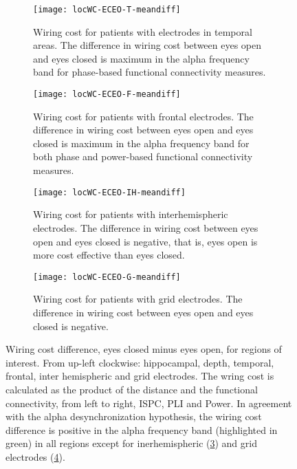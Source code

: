 \documentclass[11pt, onecolumn]{article}
\begin{document}
{\begin{figure}[p]
  
  \begin{subfigure}[t]{0.5\linewidth}
    \centering
    \texttt{[image: locWC-ECEO-T-meandiff]} 
    \caption{Wiring cost for patients with electrodes in temporal areas. The difference in wiring cost between eyes open and eyes closed is maximum in the alpha frequency band for phase-based functional connectivity measures.} 
    \label{figi-2:c} 
  \end{subfigure} 
  \hspace{1ex}
 \begin{subfigure}[t]{0.5\linewidth}
    \centering
    \texttt{[image: locWC-ECEO-F-meandiff]} 
    \caption{Wiring cost for patients with frontal electrodes. The difference in wiring cost between eyes open and eyes closed is maximum in the alpha frequency band for both phase and power-based functional connectivity measures.} 
    \label{figi-2:d} 
  \end{subfigure} 
    \begin{subfigure}[t]{ 0.5\linewidth}
    \centering
    \texttt{[image: locWC-ECEO-IH-meandiff]} 
    \caption{Wiring cost for patients with interhemispheric electrodes. The difference in wiring cost between eyes open and eyes closed is negative, that is, eyes open is more cost effective than eyes closed.} 
    \label{figi-2:e} 
  \end{subfigure}%
    \hspace{1ex}
   \begin{subfigure}[t]{0.5\linewidth}
    \centering
    \texttt{[image: locWC-ECEO-G-meandiff]} 
    \caption{Wiring cost for patients with grid electrodes. The difference in wiring cost between eyes open and eyes closed is negative.} 
    \label{figi-2:f} 
  \end{subfigure} \newpage
  \caption{Wiring cost difference, eyes closed minus eyes open, for regions of interest. From up-left clockwise: hippocampal, depth, temporal, frontal, inter hemispheric and grid electrodes. The wring cost is calculated as the product of the distance and the functional connectivity, from left to right,  ISPC, PLI and Power. In agreement with the alpha desynchronization hypothesis, the wiring cost difference is positive in the alpha frequency band (highlighted in green) in all regions except for inerhemispheric (\ref{figi-2:e}) and grid electrodes (\ref{figi-2:f}).}
  \label{fig:figi-2} 
\end{figure}
 

}
\end{document}
